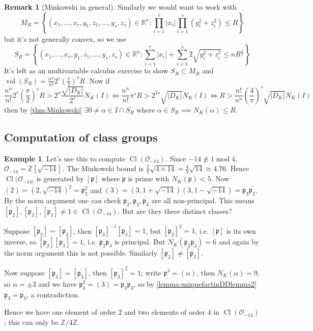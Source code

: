 \documentclass{article}
\newcommand{\Z}{\mathbb{Z}}
\newcommand{\R}{\mathbb{R}}
\newcommand{\Mod}{\operatorname{mod}}
\newcommand{\Cl}{\operatorname{Cl}}
\newcommand{\vol}{\operatorname{vol}}
\newcommand{\ri}{\mathcal{O}}
\newcommand{\ip}{\mathfrak{p}}
\theoremstyle{definition}
\newtheorem{example}[defn]{Example}
\newtheorem{remark}[defn]{Remark}
\begin{document}
\begin{remark}[Minkowski in general]
Similarly we would want to work with
\[
M_R=\left\{(x_1,\ldots,x_r,y_1,z_1,\ldots,y_s,z_s)\in\R^n:\prod_{i=1}^r|x_i|\prod_{i=1}^s\left(y_i^2+z_i^2\right)\leq R\right\}
\]
but it's not generally convex, so we use
\[
S_R=\left\{(x_1,\ldots,x_r,y_1,z_1,\ldots,y_s,z_s)\in\R^n:\sum_{i=1}^r|x_i|+\sum_{i=1}^s 2\sqrt{y_i^2+z_i^2}\leq n R^{\frac{1}{n}}\right\}
\]
It's left as an multivariable calculus exercise to show $S_R\subset M_R$ and $\vol(S_R)=\frac{n^n}{n!}2^r\left(\frac{\pi}{2}\right)^sR$. Now if
\[
\frac{n^n}{n!}2^r\left(\frac{\pi}{2}\right)^sR>2^n \frac{\sqrt{|D_K|}}{2^s} N_K(I) \iff \frac{n^n}{n!} \pi^s R>2^{2s}\sqrt{|D_K|}N_K(I) \iff R>\frac{n!}{n^n}\left(\frac{4}{\pi}\right)^s\sqrt{|D_K|}N_K(I)
\]
then by \ref{thm:Minkowski} $\exists 0\neq\alpha\in I\cap S_R$ where $\alpha\in S_R\implies N_K(\alpha)\leq R$.
\end{remark}

\subsection{Computation of class groups}

\begin{example}
\label{example:clgrpm14}
Let's use this to compute $\Cl(\ri_{-14})$. Since $-14\not\equiv 1\Mod 4$, $\ri_{-14}=\Z\left[\sqrt{-14}\right]$. The Minkowski bound is $\frac{2}{\pi}\sqrt{4\times 14}=\frac{4}{\pi}\sqrt{14}\approx 4.76$. Hence $\Cl(\ri_{-14)}$ is generated by $[\ip]$ where $\ip$ is prime with $N_K(\ip)<5$. Now $(2)=\left(2,\sqrt{-14}\right)^2=\ip_2^2$ and $(3)=\left(3,1+\sqrt{-14}\right)\left(3,1-\sqrt{-14}\right)=\ip_3\overline{\ip_3}$. By the norm argument one can check $\ip_2,\ip_3,\overline{\ip_3}$ are all non-principal. This means $[\ip_2],[\ip_3],[\overline{\ip_3}]\neq 1\in\Cl(\ri_{-14})$. But are they three distinct classes?

Suppose $[\ip_2]=[\ip_3]$, then $[\ip_3]^{-1}[\ip_3]=1$, but $[\ip_2]^2=1$, i.e. $[\ip]$ is its own inverse, so $[\ip_2][\ip_3]=1$, i.e. $\ip_2\ip_3$ is principal. But $N_K(\ip_2\ip_3)=6$ and again by the norm argument this is not possible. Similarly $[\ip_2]\neq[\overline{\ip_3}]$.

Now suppose $[\ip_3]=[\overline{\ip_3}]$, then $[\ip_3]^2=1$; write $\ip^3=(\alpha)$, then $N_K(\alpha)=9$, so $\alpha=\pm 3$ and we have $\ip_3^2=(3)=\ip_3\overline{\ip_3}$, so by \ref{lemma:uniquefactinDDlemma2} $\ip_3=\overline{\ip_3}$, a contradiction.

Hence we have one element of order 2 and two elements of order 4 in $\Cl(\ri_{-14})$; this can only be $\Z/4\Z$.
\end{example}
\end{document}
